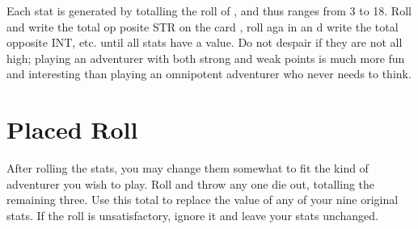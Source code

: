 \begin{multicols*}{2}
Each stat is generated by totalling the roll of , and thus ranges from 3 to 18. Roll  and write the total op posite STR on the card , roll aga in an d write the total opposite INT, etc. until all stats have a value. Do not despair if they are not all high; playing an adventurer with both strong and weak points is much more fun and interesting than playing an omnipotent adventurer who never needs to think.
\section{Placed Roll}
After rolling the stats, you may change them somewhat to fit the kind of adventurer you wish to play. Roll  and throw any one die out, totalling the remaining three. Use this total to replace the value of any of your nine original stats. If the roll is unsatisfactory, ignore it and leave your stats unchanged.

\end{multicols*}
